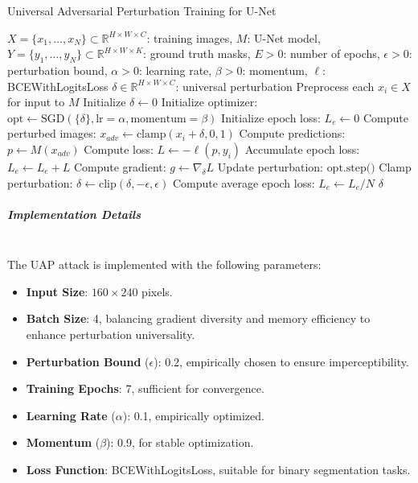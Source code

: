 \documentclass[../main.tex]{subfiles}
\begin{document}
\begin{breakablealgorithm}{Universal Adversarial Perturbation Training for U-Net}
\begin{algorithmic}[1]
\Require $X = \{x_1, \dots, x_N\} \subset \mathbb{R}^{H \times W \times C}$: training images, $M$: U-Net model, $Y = \{y_1, \dots, y_N\} \subset \mathbb{R}^{H \times W \times K}$: ground truth masks, $E > 0$: number of epochs, $\epsilon > 0$: perturbation bound, $\alpha > 0$: learning rate, $\beta > 0$: momentum, $\ell$: BCEWithLogitsLoss
\Ensure $\delta \in \mathbb{R}^{H \times W \times C}$: universal perturbation
\State Preprocess each $x_i \in X$ for input to $M$ 
\State Initialize $\delta \gets 0$ 
\State Initialize optimizer: $\text{opt} \gets \text{SGD}(\{\delta\}, \text{lr}=\alpha, \text{momentum}=\beta)$
    \State Initialize epoch loss: $L_e \gets 0$
        \State Compute perturbed images: $x_{adv} \gets \text{clamp}(x_i + \delta, 0, 1)$
        \State Compute predictions: $p \gets M(x_{adv})$ 
        \State Compute loss: $L \gets -\ell(p, y_i)$ 
        \State Accumulate epoch loss: $L_e \gets L_e + L$
        \State Compute gradient: $g \gets \nabla_{\delta} L$ 
        \State Update perturbation: $\text{opt.step()}$ 
        \State Clamp perturbation: $\delta \gets \text{clip}(\delta, -\epsilon, \epsilon)$ 
    \EndFor
    \State Compute average epoch loss: $L_e \gets L_e / N$
\EndFor
\State \Return $\delta$
\end{algorithmic}
\end{breakablealgorithm}

\subparagraph{Implementation Details}\leavevmode\\
The UAP attack is implemented with the following parameters:
\begin{itemize}
    \item \textbf{Input Size}: $160 \times 240$ pixels.
    \item \textbf{Batch Size}: 4, balancing gradient diversity and memory efficiency to enhance perturbation universality.
    \item \textbf{Perturbation Bound} ($\epsilon$): 0.2, empirically chosen to ensure imperceptibility.
    \item \textbf{Training Epochs}: 7, sufficient for convergence.
    \item \textbf{Learning Rate} ($\alpha$): 0.1, empirically optimized.
    \item \textbf{Momentum} ($\beta$): 0.9, for stable optimization.
    \item \textbf{Loss Function}: BCEWithLogitsLoss, suitable for binary segmentation tasks.
\end{itemize}
\end{document}

